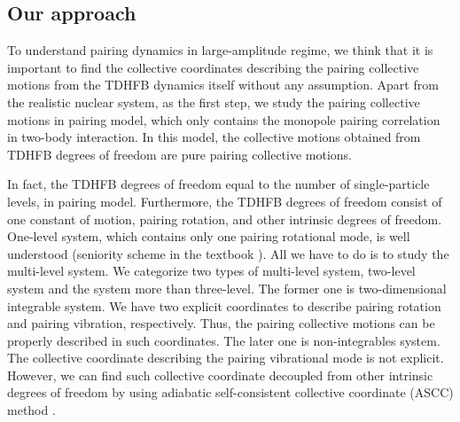 \documentclass[11pt]{book} %
\begin{document}
\subsection{Our approach}

To understand pairing dynamics in large-amplitude regime, we think that it is important to find the collective coordinates describing the pairing collective motions from the TDHFB dynamics itself without any assumption. Apart from the realistic nuclear system, as the first step, we study the pairing collective motions in pairing model, which only contains the monopole pairing correlation in two-body interaction. In this model, the collective motions obtained from TDHFB degrees of freedom are pure pairing collective motions.

In fact, the TDHFB degrees of freedom equal to the number of single-particle levels, in pairing model. Furthermore, the TDHFB degrees of freedom consist of one constant of motion, pairing rotation, and other intrinsic degrees of freedom. One-level system, which contains only one pairing rotational mode, is well understood (seniority scheme in the textbook \cite{RS80}). All we have to do is to study the multi-level system. We categorize two types of multi-level system, two-level system and the system more than three-level. The former one is two-dimensional integrable system. We have two explicit coordinates to describe pairing rotation and pairing vibration, respectively. Thus, the pairing collective motions can be properly described in such coordinates. The later one is non-integrables system. The collective coordinate describing the pairing vibrational mode is not explicit. However, we can find such collective coordinate decoupled from other intrinsic degrees of freedom by using adiabatic self-consistent collective coordinate (ASCC) method \cite{MNM00, N2012}. 
\end{document}
